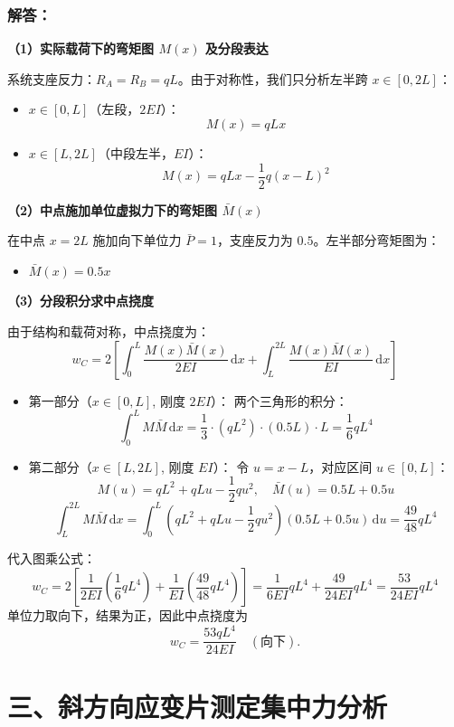 \documentclass[11pt,a4paper]{ctexrep}
\newcommand{\diff}{\,\mathrm{d}}
\begin{document}
{\subsubsection*{解答：}

\textbf{（1）实际载荷下的弯矩图 $M(x)$ 及分段表达}

系统支座反力：$R_A = R_B = qL$。由于对称性，我们只分析左半跨 $x \in [0, 2L]$：
\begin{itemize}
    \item $x \in [0, L]$（左段，$2EI$）：
    \[
        M(x) = qL x
    \]
    \item $x \in [L, 2L]$（中段左半，$EI$）：
    \[
        M(x) = qL x - \frac{1}{2}q(x - L)^2
    \]
\end{itemize}

\textbf{（2）中点施加单位虚拟力下的弯矩图 $\bar{M}(x)$ }

在中点 $x = 2L$ 施加向下单位力 $\bar{P} = 1$，支座反力为 $0.5$。左半部分弯矩图为：
\begin{itemize}
    \item $\bar{M}(x) = 0.5 x$
\end{itemize}

\textbf{（3）分段积分求中点挠度}

由于结构和载荷对称，中点挠度为：
\[
    w_C = 2 \left[ \int_{0}^{L} \frac{M(x) \bar{M}(x)}{2EI} \diff x + \int_{L}^{2L} \frac{M(x) \bar{M}(x)}{EI} \diff x \right]
\]
\begin{itemize}
    \item 第一部分（$x \in [0, L]$, 刚度 $2EI$）：
    两个三角形的积分：
    \[
        \int_{0}^{L} M \bar{M} \diff x = \frac{1}{3} \cdot (qL^2) \cdot (0.5L) \cdot L = \frac{1}{6} qL^4
    \]
    \item 第二部分（$x \in [L, 2L]$, 刚度 $EI$）：
    令 $u = x - L$，对应区间 $u \in [0, L]$：
    \[
        M(u) = qL^2 + qL u - \frac{1}{2}q u^2, \quad \bar{M}(u) = 0.5L + 0.5 u
    \]
    \[
        \int_{L}^{2L} M \bar{M} \diff x = \int_{0}^{L} \left(qL^2 + qLu - \frac{1}{2}qu^2\right) \left(0.5L + 0.5u\right) \diff u = \frac{49}{48} qL^4
    \]
\end{itemize}
代入图乘公式：
\[
    w_C = 2\left[\frac{1}{2EI}\left(\frac{1}{6}qL^4\right)+\frac{1}{EI}\left(\frac{49}{48}qL^4\right)\right]
    = \frac{1}{6EI} qL^4 + \frac{49}{24EI} qL^4 = \frac{53}{24EI} qL^4
\]
单位力取向下，结果为正，因此中点挠度为
\[
    w_C=\frac{53qL^4}{24EI}\quad(\text{向下}).
\]




\section*{三、斜方向应变片测定集中力分析}

}
\end{document}
